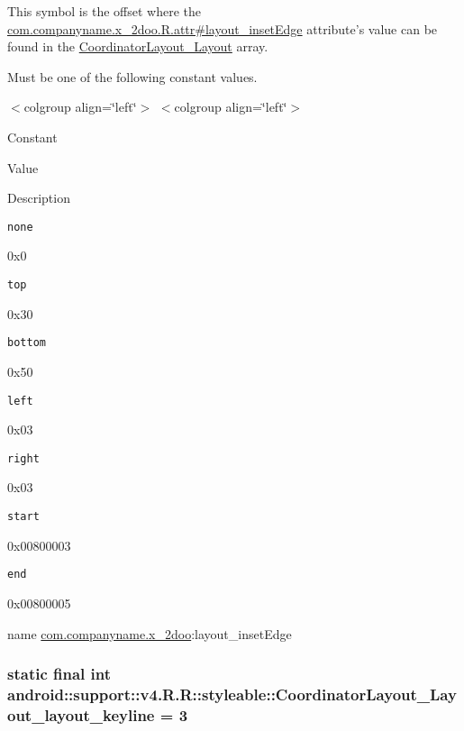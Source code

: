 This symbol is the offset where the \hyperlink{classcom_1_1companyname_1_1x__2doo_1_1_r_1_1attr_354201c6a1a7b65a5ca8ad2803cdea7f}{com.companyname.x\_\-2doo.R.attr\#layout\_\-insetEdge} attribute's value can be found in the \hyperlink{classandroid_1_1support_1_1v4_1_1_r_1_1styleable_002d98b0482bfb71440db629b16e17bf}{CoordinatorLayout\_\-Layout} array.

Must be one of the following constant values. \begin{TabularC}{0}
\hline
\end{TabularC}
$<$colgroup align=\char`\"{}left\char`\"{}$>$ $<$colgroup align=\char`\"{}left\char`\"{}$>$ 

Constant

Value

Description 

{\tt none}

0x0

{\tt top}

0x30

{\tt bottom}

0x50

{\tt left}

0x03

{\tt right}

0x03

{\tt start}

0x00800003

{\tt end}

0x00800005

name \hyperlink{namespacecom_1_1companyname_1_1x__2doo}{com.companyname.x\_\-2doo}:layout\_\-insetEdge \hypertarget{classandroid_1_1support_1_1v4_1_1_r_1_1styleable_b7235d7fb22787830b44526e15a68fe4}{
\subsubsection[{CoordinatorLayout\_\-Layout\_\-layout\_\-keyline}]{\setlength{\rightskip}{0pt plus 5cm}static final int android::support::v4.R.R::styleable::CoordinatorLayout\_\-Layout\_\-layout\_\-keyline = 3}}
\label{classandroid_1_1support_1_1v4_1_1_r_1_1styleable_b7235d7fb22787830b44526e15a68fe4}


